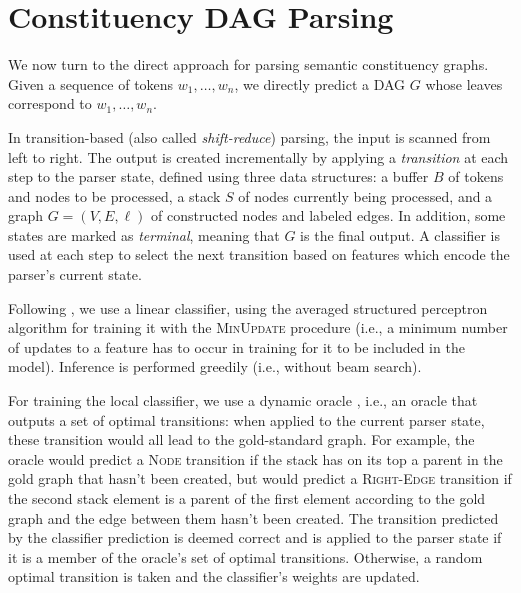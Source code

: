 \documentclass[11pt]{article}
\begin{document}
\section{Constituency DAG Parsing}\label{sec:direct_approach}

We now turn to the direct approach for parsing semantic constituency graphs. Given a sequence
of tokens $w_1, \ldots, w_n$, we directly predict a DAG $G$ whose leaves
correspond to  $w_1, \ldots, w_n$.


In transition-based (also called \textit{shift-reduce}) parsing, the input is scanned from left to right.
The output is created incrementally by applying a \textit{transition} at each step to the parser state,
defined using three data structures: a buffer $B$ of tokens and nodes to be processed,
a stack $S$ of nodes currently being processed,
and a graph $G=(V,E,\ell)$ of constructed nodes and labeled edges.
In addition, some states are marked as \textit{terminal}, meaning that $G$ is the final output.
A classifier is used at each step to select the next transition based on features
which encode the parser's current state.

Following , we use a linear classifier, using
the averaged structured perceptron algorithm for training it
\cite{Coll:04} with the \textsc{MinUpdate} \cite{cai2011language} procedure
(i.e., a minimum number of updates to a feature has to occur in training for it
to be included in the model). Inference is performed greedily (i.e., without beam search).

For training the local classifier, we use a dynamic oracle \cite{goldberg2012dynamic},
i.e., an oracle that outputs a set of optimal transitions: when applied to the current parser state, these transition would all lead to the gold-standard graph.
For example, the oracle would predict a \textsc{Node} transition if the stack 
has on its top a parent in the gold graph that hasn't been created,
but would predict a \textsc{Right-Edge} transition if the second stack element is a parent of the
first element according to the gold graph and the edge between them hasn't been created.
The transition predicted by the classifier prediction is deemed correct
and is applied to the parser state if it is a member of the oracle's set
of optimal transitions. Otherwise, a random optimal transition is taken and the
classifier's weights are updated.
\end{document}
